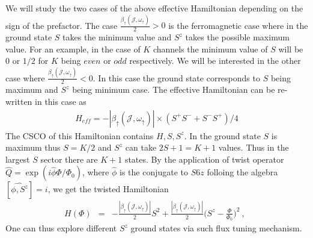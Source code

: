 \documentclass[reprint,prb,superscriptaddress]{revtex4-1}
\begin{document}
We will study the two cases of the above effective Hamiltonian depending on the sign of the prefactor. The case $\frac{\beta_{\uparrow}({\mathcal{J}},\omega_{\uparrow})}{2} >0$ is the ferromagnetic case where in the ground state $S$ takes the minimum value and $S^z$ takes the possible maximum value. For an example, in the case of $K$ channels the minimum value of $S$ will be $0$ or $1/2$ for $K$ being $even $ or $odd$ respectively.  We will be interested in the other case where $\frac{\beta_{\uparrow}({\mathcal{J}},\omega_{\uparrow})}{2} <0$. In this case the ground state corresponds to $S$ being maximum and $S^z$ being minimum case. The effective Hamiltonian can be re-written in this case as
\begin{eqnarray}
H_{eff}   =-|\beta_{\uparrow}({\mathcal{J}},\omega_{\uparrow})| \times(S^+S^{-}+ S^-S^{+}) /4   
\end{eqnarray}
\noindent The CSCO of this Hamiltonian contains $H,S,S^z$. In the ground state $S$ is maximum thus $S=K/2$ and $S^z$ can take $2S+1=K+1$ values. Thus in the largest $S$ sector there are $K+1$ states. By the application of twist operator $\hat{Q}=\exp(i\hat{\phi}\Phi/\Phi_0)$, where $\hat{\phi}$ is the conjugate to $S6z$ folloing the algebra $[\hat{\phi,S^z}]=i$, we get the twisted Hamiltonian 
\begin{eqnarray}
H(\Phi) &=& -\frac{|\beta_{\uparrow}({\mathcal{J}},\omega_{\uparrow})|}{2} S^2   +\frac{|\beta_{\uparrow}({\mathcal{J}},\omega_{\uparrow})|}{2} \bigg(S^{z}-\frac{\Phi}{\Phi_0} \bigg)^2 ~,~~
\label{eq:flux_spectral}
\end{eqnarray}
One can thus explore different $S^z$ ground states via such flux tuning mechanism.
\end{document}
